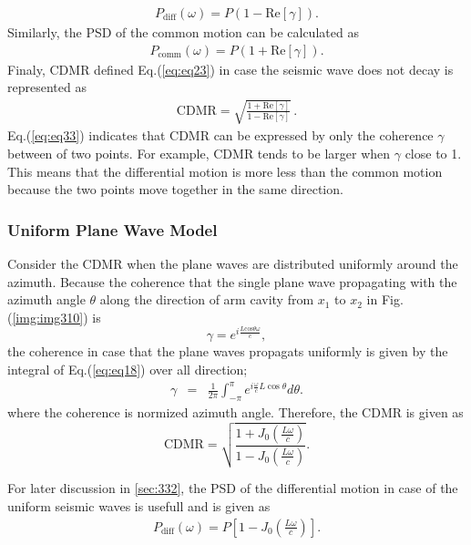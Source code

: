 \begin{eqnarray} \label{eq:eq32}
  P_{\mathrm{diff}}(\omega) = P (1-\mathrm{Re}\left[\gamma\right]).
\end{eqnarray}
Similarly, the PSD of the common motion can be calculated as
\begin{eqnarray}
  P_{\mathrm{comm}}(\omega) = P (1+\mathrm{Re}\left[\gamma\right]).
\end{eqnarray}
Finaly, CDMR defined Eq.(\ref{eq:eq23}) in case the seismic wave does not decay is represented as
\begin{eqnarray}
 \mathrm{CDMR} = \sqrt{\frac{1 + \mathrm{Re} \left[\gamma \right] }{1 - \mathrm{Re} \left[\gamma \right]}}\,. \label{eq:eq33}
\end{eqnarray}
Eq.(\ref{eq:eq33}) indicates that CDMR can be expressed by only the coherence $\gamma$ between of two points. For example, CDMR tends to be larger when $\gamma$ close to 1. This means that the differential motion is more less than the common motion because the two points move together in the same direction.


\subsubsection{Uniform Plane Wave Model}
Consider the CDMR when the plane waves are distributed uniformly around the azimuth. Because the coherence that the single plane wave propagating with the azimuth angle $\theta$ along the direction of arm cavity from $x_1$ to $x_2$ in Fig.(\ref{img:img310}) is 
\begin{equation}
  \gamma = e^{i\frac{L\mathrm{cos}\theta\omega}{c}}, \label{eq:eq18}
\end{equation} 
the coherence in case that the plane waves propagats uniformly is given by the integral of Eq.(\ref{eq:eq18}) over all direction;
\begin{eqnarray} \label{eq:eq19}
  \gamma &=& \frac{1}{2\pi} \int_{-\pi}^{\pi} e^{i\frac{\omega}{c} L\cos \theta} d \theta .
\end{eqnarray}
where the coherence is normized azimuth angle. Therefore, the CDMR is given as
\begin{equation}  \label{eq:eq20}
  \mathrm{CDMR} = \sqrt{\frac{1+J_0(\frac{L\omega}{c})}{1-J_0(\frac{L\omega}{c})}} .
\end{equation}

For later discussion in \cref{sec:332}, the PSD of the differential motion in case of the uniform seismic waves is usefull and is given as
\begin{eqnarray} \label{eq:eq21}
  P_{\mathrm{diff}}(\omega) = P \left[1-J_0\left(\frac{L\omega}{c}\right)\right] .
\end{eqnarray}

